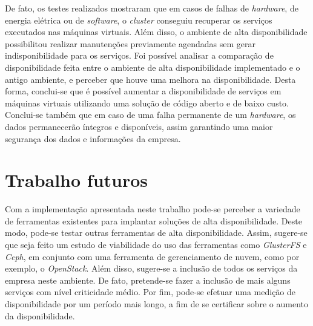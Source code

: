 De fato, os testes realizados mostraram que em casos de falhas de \textit{hardware}, de energia elétrica ou de \textit{software}, 
o \textit{cluster} conseguiu recuperar os serviços executados nas máquinas virtuais. Além disso, o ambiente de alta disponibilidade possibilitou
realizar manutenções previamente agendadas sem gerar indisponibilidade para os serviços.
Foi possível analisar a comparação de disponibilidade feita entre o ambiente de alta disponibilidade implementado e o antigo ambiente,
e perceber que houve uma melhora na disponibilidade. 
Desta forma, conclui-se que é possível aumentar a disponibilidade de serviços em máquinas virtuais utilizando uma solução 
de código aberto e de baixo custo.
Conclui-se também que em caso de uma falha permanente de um \textit{hardware}, os dados permanecerão íntegros e disponíveis, assim garantindo 
uma maior segurança dos dados e informações da empresa.


\section{Trabalho futuros}
\label{section:trabalhosfuturos}

Com a implementação apresentada neste trabalho pode-se perceber a variedade de ferramentas existentes para implantar soluções de alta 
disponibilidade. Deste modo, pode-se testar outras ferramentas de alta disponibilidade. Assim, sugere-se que seja feito um estudo de
viabilidade do uso das ferramentas como \textit{GlusterFS} e \textit{Ceph}, em conjunto com uma ferramenta de gerenciamento de nuvem, como
por exemplo, o \textit{OpenStack}.
Além disso, sugere-se a inclusão de todos os serviços da empresa neste ambiente. De fato, pretende-se fazer a inclusão de mais alguns
serviços com nível criticidade médio.
Por fim, pode-se efetuar uma medição de disponibilidade por um período mais longo, a fim de se certificar sobre o aumento da
disponibilidade.

